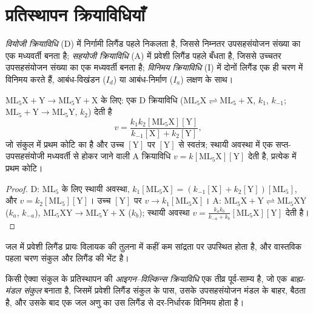 \section{प्रतिस्थापन क्रियाविधियाँ}

\begin{definition}[वियोजी, सहयोजी और विनिमय क्रियाविधियाँ]\label{def:b3:complex-mechanisms:mechanisms}
\emph{वियोजी क्रियाविधि} (D) में निर्गामी
लिगैंड पहले निकलता है, जिससे निम्नतर उपसहसंयोजन संख्या का एक मध्यवर्ती बनता है;
\emph{सहयोजी क्रियाविधि} (A) में प्रवेशी लिगैंड
पहले बँधता है, जिससे उच्चतर उपसहसंयोजन संख्या का एक मध्यवर्ती बनता है;
\emph{विनिमय क्रियाविधि} (I) में दोनों लिगैंड
एक ही चरण में विनिमय करते हैं, आबंध-विखंडन ($I_d$) या आबंध-निर्माण ($I_a$)
लक्षण के साथ।
\end{definition}

\begin{proposition}[D और A क्रियाविधियों के दर नियम]\label{prop:b3:complex-mechanisms:d-a-laws}
$\mathrm{ML_5X + Y \to ML_5Y + X}$ के लिए: एक D क्रियाविधि ($\mathrm{ML_5X} \rightleftharpoons \mathrm{ML_5} + \mathrm X$, $k_1$, $k_{-1}$; $\mathrm{ML_5} + \mathrm Y
\to \mathrm{ML_5Y}$, $k_2$) देती है
\[
  v = \frac{k_1k_2[\mathrm{ML_5X}][\mathrm Y]}{k_{-1}[\mathrm X] + k_2[\mathrm Y]},
\]
जो संकुल में प्रथम कोटि का है और उच्च $[\mathrm Y]$ पर $[\mathrm Y]$ से स्वतंत्र; स्थायी अवस्था में
एक सप्त-उपसहसंयोजी मध्यवर्ती से होकर जाने वाली A क्रियाविधि $v =
k[\mathrm{ML_5X}][\mathrm Y]$ देती है, प्रत्येक में प्रथम कोटि।
\end{proposition}

\begin{proof}
D: $\mathrm{ML_5}$ के लिए स्थायी अवस्था, $k_1[\mathrm{ML_5X}] = (k_{-1}[\mathrm X] + k_2[\mathrm Y])[\mathrm{ML_5}]$, और $v = k_2[\mathrm{ML_5}][\mathrm Y]$।
उच्च $[\mathrm Y]$ पर $v \to k_1[\mathrm{ML_5X}]$। A: $\mathrm{ML_5X} + \mathrm Y \rightleftharpoons \mathrm{ML_5XY}$ ($k_a$, $k_{-a}$), $\mathrm{ML_5XY} \to
\mathrm{ML_5Y} + \mathrm X$ ($k_b$); स्थायी अवस्था $v = \frac{k_ak_b}{k_{-a} + k_b}[\mathrm{ML_5X}][\mathrm Y]$ देती है।
\end{proof}

जल में प्रवेशी लिगैंड प्रायः विलायक की तुलना में कहीं कम सांद्रता पर उपस्थित होता है,
और वास्तविक पहला चरण संकुल और
लिगैंड की भेंट है।

\begin{definition}[आइगन--विल्किन्स क्रियाविधि]\label{def:b3:complex-mechanisms:eigen-wilkins}
किसी ऐक्वा संकुल के प्रतिस्थापन की \emph{आइगन--विल्किन्स क्रियाविधि}
एक तीव्र पूर्व-साम्य है, जो एक \emph{बाह्य-मंडल संकुल} बनाता है,
जिसमें प्रवेशी लिगैंड संकुल के पास, उसके उपसहसंयोजन मंडल के बाहर, बैठता है, और उसके बाद
एक जल अणु का उस लिगैंड से दर-निर्धारक विनिमय होता है।
\end{definition}

